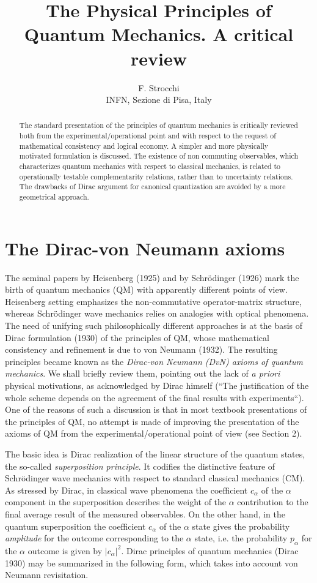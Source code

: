 \documentclass[12pt]{article}
\title{The Physical Principles of Quantum Mechanics. A critical review}
\author{F. Strocchi \\ INFN, Sezione di Pisa, Italy}
\date{}
\def \a {{\alpha}}
\begin{document}
\maketitle

\begin{abstract}
The standard presentation of the principles of quantum mechanics is critically reviewed both from the experimental/opera\-ti\-o\-nal point   and with respect to the request of mathematical consistency and logical economy. A simpler and more physically motivated formulation is discussed. The existence of non commuting observables, which characterizes quantum mechanics with respect to classical mechanics, is related to operationally testable complementarity relations, rather than to uncertainty relations. The drawbacks of Dirac argument for canonical quantization are avoided by a more geometrical approach.
\end{abstract}  


\section{The Dirac-von Neumann axioms}

The seminal papers by Heisenberg (1925) and by Schr\"odinger (1926)  mark the birth of quantum mechanics (QM) with apparently different points of view.  Heisenberg setting emphasizes the non-commu\-ta\-tive operator-matrix structure, whereas Schr\"odinger wave mechanics relies on analogies with optical phenomena. The need of unifying such philosophically different approaches is at the basis of Dirac formulation (1930)  of the principles of QM, whose mathematical consistency and refinement is due to von Neumann (1932). The resulting principles  became known as the {\em Dirac-von Neumann (DvN) axioms of quantum mechanics}. We shall briefly review them, pointing out the lack of {\em a priori} physical motivations, as acknowledged by Dirac himself (``The justification of the whole scheme depends on the agreement of the final results with experiments``).  One of the reasons of such a  discussion is that in most  textbook presentations of the principles of  QM, no attempt is made of improving the presentation of the axioms of QM from the experimental/operational point of view (see Section 2).   


  The basic idea is Dirac realization of the linear structure of the quantum states, the so-called {\em superposition principle}. It codifies the distinctive feature  of Schr\"odinger wave mechanics with respect to  standard classical mechanics (CM). As stressed by Dirac, in classical wave phenomena  the coefficient $c_\a$ of the $\a$ component in the   superposition describes the weight  of the $\alpha $ contribution  to the final average result of  the measured  observables. On the other hand, in the quantum superposition the coefficient $c_\a$  of the $\a$ state  gives the probability {\em amplitude} for the outcome corresponding to the $\a$ state, i.e. the probability $p_\a$ for the $\a$ outcome is given by $|c_\a|^2$. 
Dirac principles of quantum mechanics (Dirac 1930) may be summarized in the following form, which takes into account  von Neumann revisitation.
\end{document}
